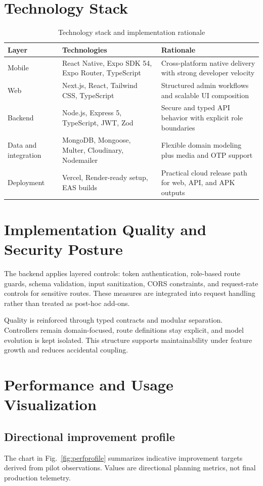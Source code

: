 \documentclass[conference]{IEEEtran}
\begin{document}
\section{Technology Stack}
\begin{table}[!t]
\caption{Technology stack and implementation rationale}
\centering
\begin{tabularx}{\textwidth}{@{}p{2.8cm}p{4.7cm}p{6.3cm}@{}}
\toprule
\textbf{Layer} & \textbf{Technologies} & \textbf{Rationale} \\
\midrule
Mobile & React Native, Expo SDK 54, Expo Router, TypeScript & Cross-platform native delivery with strong developer velocity \\
Web & Next.js, React, Tailwind CSS, TypeScript & Structured admin workflows and scalable UI composition \\
Backend & Node.js, Express 5, TypeScript, JWT, Zod & Secure and typed API behavior with explicit role boundaries \\
Data and integration & MongoDB, Mongoose, Multer, Cloudinary, Nodemailer & Flexible domain modeling plus media and OTP support \\
Deployment & Vercel, Render-ready setup, EAS builds & Practical cloud release path for web, API, and APK outputs \\
\bottomrule
\end{tabularx}
\label{tab:stack}
\end{table}

\section{Implementation Quality and Security Posture}
The backend applies layered controls: token authentication, role-based route guards, schema validation, input sanitization, CORS constraints, and request-rate controls for sensitive routes. These measures are integrated into request handling rather than treated as post-hoc add-ons.

Quality is reinforced through typed contracts and modular separation. Controllers remain domain-focused, route definitions stay explicit, and model evolution is kept isolated. This structure supports maintainability under feature growth and reduces accidental coupling.

\section{Performance and Usage Visualization}
\subsection{Directional improvement profile}
The chart in Fig.~\ref{fig:perfprofile} summarizes indicative improvement targets derived from pilot observations. Values are directional planning metrics, not final production telemetry.
\end{document}
